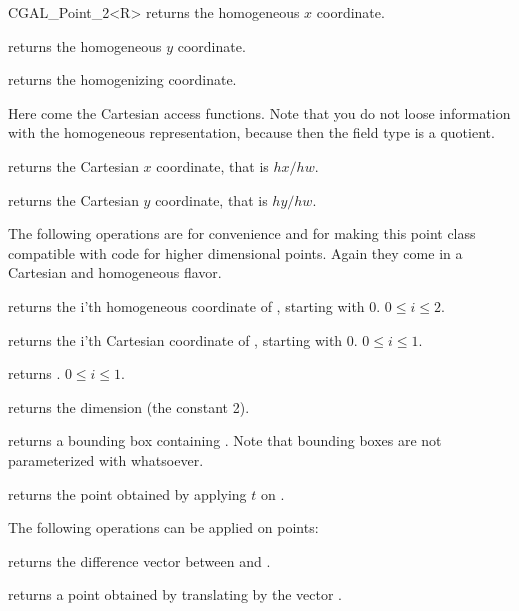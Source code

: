 \begin{ccClassTemplate} {CGAL_Point_2<R>}
       {returns the homogeneous $x$ coordinate.}

       {returns the homogeneous $y$ coordinate.}

       {returns the homogenizing  coordinate.}

Here come the Cartesian access functions. Note that you do not loose
information with the homogeneous representation, because then the field
type is a quotient.

       {returns the Cartesian $x$ coordinate, that is $hx/hw$.}

       {returns the Cartesian $y$ coordinate, that is $hy/hw$.}


The following operations are for convenience and for making this
point class compatible with code for higher dimensional points.
Again they come in a Cartesian and homogeneous flavor.

       {returns the i'th homogeneous coordinate of \ccVar, starting with 0.
        \ccPrecond $0\leq i \leq 2$.}

       {returns the i'th Cartesian coordinate of \ccVar, starting with 0.
        \ccPrecond $0\leq i \leq 1$.}

       {returns .
        \ccPrecond $0\leq i \leq 1$.}

       {returns the dimension (the constant 2).}

       {returns a bounding box containing \ccVar. Note that bounding boxes
        are not parameterized with whatsoever. }

       {returns the point obtained by applying $t$ on \ccVar.}



The following operations can be applied on points:

       {returns the difference vector between  and .}

       {returns a point obtained by translating  by the 
        vector .}


\end{ccClassTemplate}
